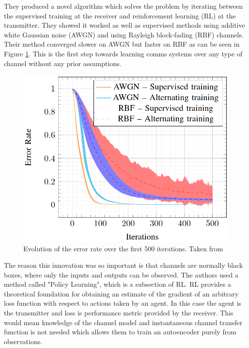\documentclass[12pt,onecolumn,letterpaper]{article}
\newcommand\genfigsize{0.5}
\begin{document}
They produced a novel algorithm which solves the problem by iterating between the supervised training at the receiver and reinforcement learning (RL) at the transmitter. They showed it worked as well as supervised methods using additive white Gaussian noise (AWGN) and using Rayleigh block-fading (RBF) channels. Their method converged slower on AWGN but faster on RBF as can be seen in Figure \ref{fig:AoudiaTrainingSpeeds}. This is the first step towards learning comms systems over any type of channel without any prior assumptions. 

\begin{figure}[t]
   \centering
   \includegraphics[width=\genfigsize\linewidth]{figures/Aoudia_relative_training_speeds.PNG}
   \caption{Evolution of the error rate over the first 500 iterations. Taken from~\cite{Aoudia}}
\label{fig:AoudiaTrainingSpeeds}
\end{figure}

The reason this innovation was so important is that channels are normally black boxes, where only the inputs and outputs can be observed. The authors used a method called "Policy Learning", which is a subsection of RL. RL provides a theoretical foundation for obtaining an estimate of the gradient of an arbitrary loss function with respect to actions taken by an agent. In this case the agent is the transmitter and loss is performance metric provided by the receiver. This would mean knowledge of the channel model and instantaneous channel transfer function is not needed which allows them to train an autoencoder purely from observations. 
\end{document}
